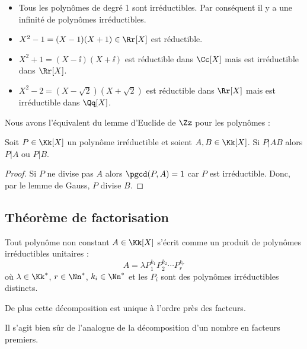 \documentclass[class=report,crop=false]{standalone}
\begin{document}
\begin{exemple}
\sauteligne
\begin{itemize}
  \item Tous les polynômes de degré 1 sont irréductibles. Par conséquent il y a
  une infinité de polynômes irréductibles.

  \item $X^2-1=(X-1)(X+1)\in\Rr[X]$ est réductible.

  \item $X^2+1=(X-\ii)(X+\ii)$ est réductible dans $\Cc[X]$ mais est irréductible dans $\Rr[X]$.

  \item $X^2-2=(X-\sqrt2)(X+\sqrt2)$ est réductible dans $\Rr[X]$ mais est irréductible dans $\Qq[X]$.
\end{itemize}
\end{exemple}




Nous avons l'équivalent du lemme d'Euclide de $\Zz$ pour les polynômes :
\begin{proposition}
Soit $P\in\Kk[X]$ un polynôme irréductible et soient $A, B\in\Kk[X]$.
Si $P|AB$ alors $P|A$ ou $P|B$.
\end{proposition}

\begin{proof}
Si $P$ ne divise pas $A$ alors $\pgcd(P,A)=1$ car $P$ est irréductible.
Donc, par le lemme de Gauss, $P$ divise $B$.
\end{proof}


\subsection{Théorème de factorisation}


\begin{theoreme}
Tout polynôme non constant $A\in\Kk[X]$ s'écrit comme un produit de polynômes
irréductibles unitaires :
$$A= \lambda  P_1^{k_1}P_2^{k_2} \cdots P_r^{k_r}$$
 où $\lambda\in\Kk^*$, $r \in \Nn^*$, $k_i \in \Nn^*$
et les $P_i$ sont des polynômes irréductibles distincts.

De plus cette décomposition est unique à l'ordre près des facteurs.
\end{theoreme}

Il s'agit bien sûr de l'analogue de la décomposition d'un nombre en facteurs premiers.
\end{document}
